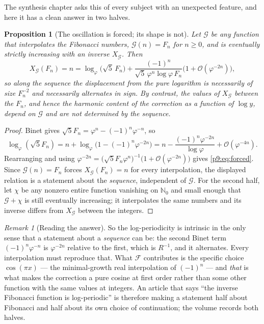 \documentclass[11pt,a4paper,oneside]{book}
\theoremstyle{plain}
\newtheorem{proposition}[theorem]{Proposition}
\theoremstyle{definition}
\theoremstyle{remark}
\newtheorem{remark}[theorem]{Remark}
\newcommand{\Nat}{\mathbb{N}}
\newcommand{\bigO}{\mathcal{O}}
\begin{document}
The synthesis chapter asks this of every subject with an unexpected feature,
and here it has a clean answer in two halves.

\begin{proposition}[The oscillation is forced; its shape is not]
\label{p9:prop:intrinsic}
Let $\mathcal{G}$ be any function that interpolates the Fibonacci numbers,
$\mathcal{G}(n)=F_n$ for $n\ge0$, and is eventually strictly increasing with
an inverse $X_{\mathcal G}$.  Then
\begin{equation}\label{p9:eq:forced}
 X_{\mathcal G}(F_n)=n
 =\log_\varphi\bigl(\sqrt5\,F_n\bigr)
 +\frac{(-1)^{n}}{\sqrt5\,\varphi^{n}\log\varphi\,F_n}
 \bigl(1+\bigO(\varphi^{-2n})\bigr),
\end{equation}
so along the sequence the displacement from the pure logarithm is
\emph{necessarily} of size $F_n^{-2}$ and \emph{necessarily} alternates in
sign.  By contrast, the values of $X_{\mathcal G}$ between the $F_n$, and
hence the harmonic content of the correction as a function of $\log y$,
depend on $\mathcal G$ and are not determined by the sequence.
\end{proposition}

\begin{proof}
Binet gives $\sqrt5F_n=\varphi^{n}-(-1)^{n}\varphi^{-n}$, so
\[
 \log_\varphi(\sqrt5F_n)
 =n+\log_\varphi\bigl(1-(-1)^{n}\varphi^{-2n}\bigr)
 =n-\frac{(-1)^{n}\varphi^{-2n}}{\log\varphi}
 +\bigO(\varphi^{-4n}).
\]
Rearranging and using $\varphi^{-2n}=\bigl(\sqrt5F_n\varphi^{n}\bigr)^{-1}
\bigl(1+\bigO(\varphi^{-2n})\bigr)$ gives \eqref{p9:eq:forced}.  Since
$\mathcal{G}(n)=F_n$ forces $X_{\mathcal G}(F_n)=n$ for every interpolation,
the displayed relation is a statement about the \emph{sequence}, independent of
$\mathcal G$.  For the second half, let $\chi$ be any nonzero entire function
vanishing on $\Nat_0$ and small enough that $\mathcal{G}+\chi$ is still
eventually increasing; it interpolates the same numbers and its inverse
differs from $X_{\mathcal G}$ between the integers.
\end{proof}

\begin{remark}[Reading the answer]\label{p9:rem:intrinsic-reading}
So the log-periodicity is intrinsic in the only sense that a statement about a
\emph{sequence} can be: the second Binet term $(-1)^{n}\varphi^{-n}$ is
$\varphi^{-2n}$ relative to the first, which is $R^{-1}$, and it alternates.
Every interpolation must reproduce that.  What $\mathcal{F}$ contributes is
the specific choice $\cos(\pi x)$ --- the minimal-growth real interpolation of
$(-1)^{n}$ --- and \emph{that} is what makes the correction a pure cosine at
first order rather than some other function with the same values at integers.
An article that says ``the inverse Fibonacci function is log-periodic'' is
therefore making a statement half about Fibonacci and half about its own
choice of continuation; the volume records both halves.
\end{remark}
\end{document}
